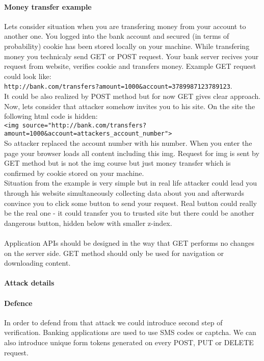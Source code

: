 \paragraph{Money transfer example} Lets consider situation when you are transfering money from your account to another one.
You logged into the bank account and secured (in terms of probability) cookie has been stored locally on your machine.
While transfering money you technicaly send GET or POST request.
Your bank server recives your request from website, verifies cookie and transfers money.
Example GET request could look like: \\
\texttt{http://bank.com/transfers?amount=1000\&account=3789987123789123}. \\
It could be also realized by POST method but for now GET gives clear approach.
Now, lets consider that attacker somehow invites you to his site.
On the site the following html code is hidden: \\
\texttt{<img source="http://bank.com/transfers?amount=1000\&account=attackers\_account\_number">}\\
So attacker replaced the account number with his number.
When you enter the page your browser loads all content including this img.
Request for img is sent by GET method but is not the img course but just money transfer which is confirmed by cookie stored on your machine.\\

Situation from the example is very simple but in real life attacker could lead you through his website simultaneously collecting data about you and afterwards convince you to click some button to send your request.
Real button could really be the real one - it could transfer you to trusted site but there could be another dangerous button, hidden below with smaller z-index. \\\\
Application APIs should be designed in the way that GET performs no changes on the server side.
GET method should only be used for navigation or downloading content.
\paragraph{Attack details}
\paragraph{Defence} In order to defend from that attack we could introduce second step of verification.
Banking applications are used to use SMS codes or captcha.
We can also introduce unique form tokens generated on every POST, PUT or DELETE request.

